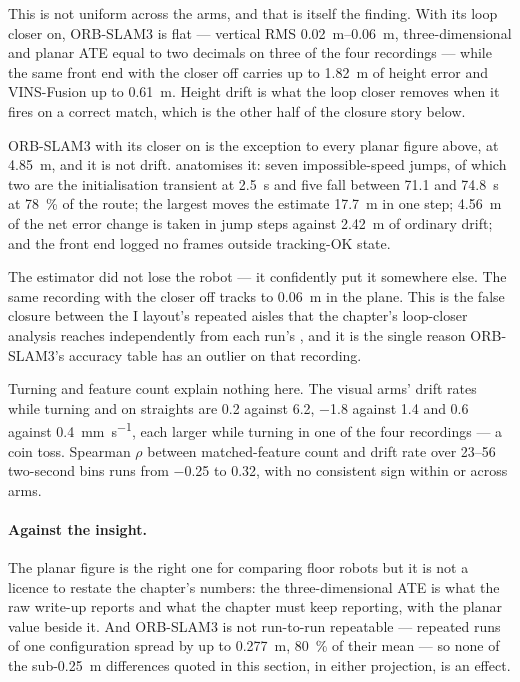 \documentclass[11pt,a4paper,notitlepage]{report}
\begin{document}
This is not uniform across the arms, and that is itself the finding. With its
loop closer on, ORB-SLAM3 is flat --- vertical RMS
\SIrange{0.02}{0.06}{\metre}, three-dimensional and planar ATE equal to two
decimals on three of the four recordings --- while the same front end with the
closer off carries up to \SI{1.82}{\metre} of height error and VINS-Fusion up
to \SI{0.61}{\metre}. Height drift is what the loop closer removes when it
fires on a correct match, which is the other half of the closure story below.

ORB-SLAM3 with its closer on  is the
exception to every planar figure above, at \SI{4.85}{\metre}, and it is not
drift.
 anatomises it: seven impossible-speed jumps, of which
two are the initialisation transient at \SI{2.5}{\second} and five fall
between \SI{71.1}{} and \SI{74.8}{\second} at \SI{78}{\percent} of the route;
the largest moves the estimate \SI{17.7}{\metre} in one step;
\SI{4.56}{\metre} of the net error change is taken in jump steps against
\SI{2.42}{\metre} of ordinary drift; and the front end logged no frames
outside tracking-OK state.

The estimator did not lose the robot --- it confidently put it somewhere else.
The same recording with the closer off
tracks to \SI{0.06}{\metre} in the plane. This is the false closure between
the I layout's repeated aisles that the chapter's loop-closer analysis reaches
independently from each run's , and it is the single
reason
ORB-SLAM3's accuracy table has an outlier on that recording.

Turning and feature count explain nothing here. The visual arms' drift rates
while turning and on straights are \SI{0.2}{} against \SI{6.2}{},
\SI{-1.8}{} against \SI{1.4}{} and \SI{0.6}{} against
\SI{0.4}{\milli\metre\per\second}, each larger while turning in one of the
four recordings --- a coin toss. Spearman $\rho$ between matched-feature count
and drift rate over \numrange{23}{56} two-second bins runs from
\num{-0.25} to \num{+0.32}, with no consistent sign within or across arms.

\paragraph{Against the insight.} The planar figure is the right one for
comparing floor robots but it is not a licence to restate the chapter's
numbers: the three-dimensional ATE is what the raw write-up reports and what
the chapter must keep reporting, with the planar value beside it. And
ORB-SLAM3 is not run-to-run repeatable --- repeated runs of one configuration
spread by up to \SI{0.277}{\metre}, \SI{80}{\percent} of their mean --- so none
of the sub-\SI{0.25}{\metre} differences quoted in this section, in either
projection, is an effect.
\end{document}
